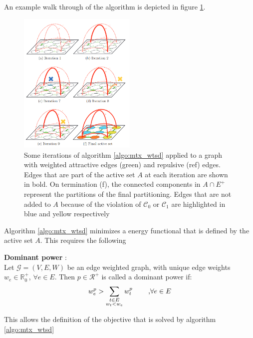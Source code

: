 An example walk through of the algorithm is depicted in figure \ref{fig_mtxwtsd1}. \\

\begin{figure}
	\centering
	\includegraphics[width=0.5\textwidth]{figures/mutexwatershed/walkthrough}
	\caption{Some iterations of algorithm \ref{algo:mtx_wtsd} applied to a graph with weighted attractive edges (green) and repulsive (ref) edges. Edges that are part of the active set $A$ at each iteration are shown in bold. On termination (f), the connected components in $A \cap E^+$ represent the partitions of the final partitioning. Edges that are not added to $A$ because of the violation of $\mathcal{C}_0$ or $\mathcal{C}_1$ are highlighted in blue and yellow respectively \cite{wolf2019mutex}}
	\label{fig_mtxwtsd1}
\end{figure}

\newpage
Algorithm \ref{algo:mtx_wtsd} minimizes a energy functional that is defined by the active set $A$. This requires the following 
\begin{defn}
	\textbf{Dominant power} \cite{wolf2019mutex}: \\
	Let $\mathcal{G} = (V, E, W)$ be an edge weighted graph, with unique edge weights $w_e \in \mathbb{R}_0^+$, $\forall e \in E$. Then $p \in \mathcal{R}^+$ is called a dominant power if:\\
	\begin{align}
		w_e^p > \sum_{\substack{t \in E \\ w_t < w_e}} w_t^p \text{\hspace{8mm},} \forall e \in E
	\end{align}
\end{defn}
 This allows the definition of the objective that is solved by algorithm \ref{algo:mtx_wtsd}
 
